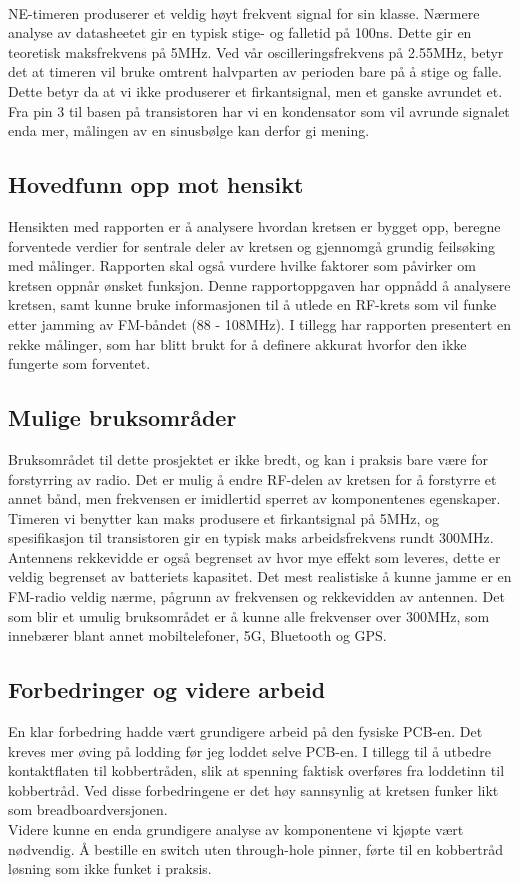 \\[1em]
NE-timeren produserer et veldig høyt frekvent signal for sin klasse. Nærmere analyse av datasheetet gir en typisk stige- og falletid på 100ns. Dette gir en teoretisk maksfrekvens på 5MHz. Ved vår oscilleringsfrekvens på 2.55MHz, betyr det at timeren vil bruke omtrent halvparten av perioden bare på å stige og falle. Dette betyr da at vi ikke produserer et firkantsignal, men et ganske avrundet et. Fra pin 3 til basen på transistoren har vi en kondensator som vil avrunde signalet enda mer, målingen av en sinusbølge kan derfor gi mening.

\subsection{Hovedfunn opp mot hensikt}
Hensikten med rapporten er å analysere hvordan kretsen er bygget opp, beregne forventede verdier for sentrale deler av kretsen og gjennomgå grundig feilsøking med målinger. Rapporten skal også vurdere hvilke faktorer som påvirker om kretsen oppnår ønsket funksjon. Denne rapportoppgaven har oppnådd å analysere kretsen, samt kunne bruke informasjonen til å utlede en RF-krets som vil funke etter jamming av FM-båndet (88 - 108MHz). I tillegg har rapporten presentert en rekke målinger, som har blitt brukt for å definere akkurat hvorfor den ikke fungerte som forventet.

\subsection{Mulige bruksområder}
Bruksområdet til dette prosjektet er ikke bredt, og kan i praksis bare være for forstyrring av radio. Det er mulig å endre RF-delen av kretsen for å forstyrre et annet bånd, men frekvensen er imidlertid sperret av komponentenes egenskaper. Timeren vi benytter kan maks produsere et firkantsignal på 5MHz, og spesifikasjon til transistoren gir en typisk maks arbeidsfrekvens rundt 300MHz.
\\[1em]
Antennens rekkevidde er også begrenset av hvor mye effekt som leveres, dette er veldig begrenset av batteriets kapasitet. Det mest realistiske å kunne jamme er en FM-radio veldig nærme, pågrunn av frekvensen og rekkevidden av antennen. Det som blir et umulig bruksområdet er å kunne alle frekvenser over 300MHz, som innebærer blant annet mobiltelefoner, 5G, Bluetooth og GPS.

\subsection{Forbedringer og videre arbeid}
En klar forbedring hadde vært grundigere arbeid på den fysiske PCB-en. Det kreves mer øving på lodding før jeg loddet selve PCB-en. I tillegg til å utbedre kontaktflaten til kobbertråden, slik at spenning faktisk overføres fra loddetinn til kobbertråd. Ved disse forbedringene er det høy sannsynlig at kretsen funker likt som breadboardversjonen.
\\[1em] 
Videre kunne en enda grundigere analyse av komponentene vi kjøpte vært nødvendig. Å bestille en switch uten through-hole pinner, førte til en kobbertråd løsning som ikke funket i praksis. 